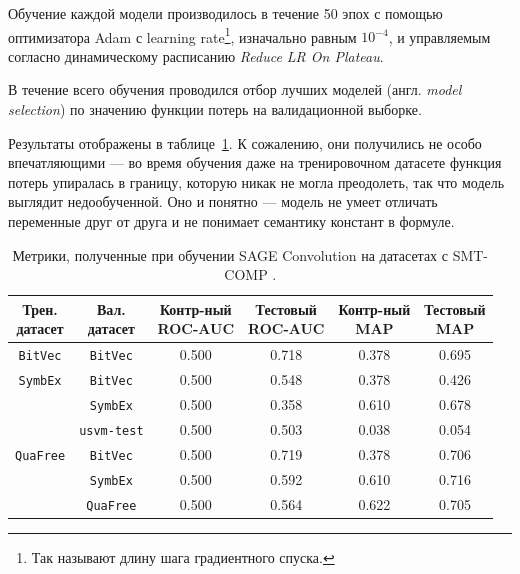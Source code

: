 Обучение каждой модели производилось в течение 50 эпох с помощью оптимизатора Adam \cite{adam-paper} с learning rate\footnote{Так называют длину шага градиентного спуска.}, изначально равным $10^{-4}$, и управляемым согласно динамическому расписанию \textit{Reduce LR On Plateau}.

В течение всего обучения проводился отбор лучших моделей (англ. \textit{model selection}) по значению функции потерь на валидационной выборке.

Результаты отображены в таблице~\ref{smt-comp-val-results}. К сожалению, они получились не особо впечатляющими --- во время обучения даже на тренировочном датасете функция потерь упиралась в границу, которую никак не могла преодолеть, так что модель выглядит недообученной. Оно и понятно --- модель не умеет отличать переменные друг от друга и не понимает семантику констант в формуле.

\begin{table}[ht]
\begin{center}
\begin{tabular}{c|c||cc|cc}
    \makecell{Трен. \\ датасет} & \makecell{Вал. \\ датасет} & \makecell{Контр-ный \\ \textsc{ROC-AUC}} & \makecell{Тестовый \\ \textsc{ROC-AUC}} & \makecell{Контр-ный \\ \textsc{MAP}} & \makecell{Тестовый \\ \textsc{MAP}} \\
    \hline \hline
    \rule{0pt}{2.5ex}
    \texttt{BitVec}  & \texttt{BitVec}     & 0.500 & 0.718 & 0.378 & 0.695 \\
    \hline
    \texttt{SymbEx}  & \texttt{BitVec}     & 0.500 & 0.548 & 0.378 & 0.426 \\
                     & \texttt{SymbEx}     & 0.500 & 0.358 & 0.610 & 0.678 \\
                     & \texttt{usvm-test}  & 0.500 & 0.503 & 0.038 & 0.054 \\
    \hline
    \texttt{QuaFree} & \texttt{BitVec}     & 0.500 & 0.719 & 0.378 & 0.706 \\
                     & \texttt{SymbEx}     & 0.500 & 0.592 & 0.610 & 0.716 \\
                     & \texttt{QuaFree}    & 0.500 & 0.564 & 0.622 & 0.705 \\
\end{tabular}
\caption{\label{smt-comp-val-results} Метрики, полученные при обучении SAGE Convolution на датасетах с SMT-COMP \cite{smt-comp-2023-benchmarks}.}
\end{center}
\end{table}

